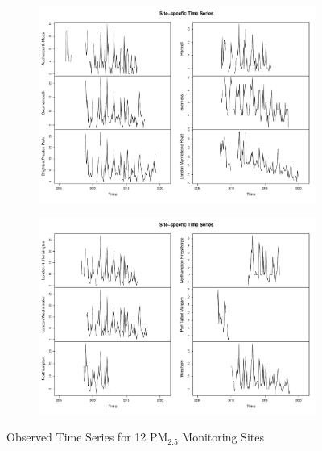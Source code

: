 \begin{figure}
    \begin{subfigure}{.5\textwidth}
        \centering
        \includegraphics[width=\linewidth]{Images/Site ts 1.pdf}
    \end{subfigure}%
    \begin{subfigure}{.5\textwidth}
        \centering
        \includegraphics[width=\linewidth]{Images/Site ts 2.pdf}
    \end{subfigure}
\caption{Observed Time Series for 12 PM$_{2.5}$ Monitoring Sites}
\label{fig:timesites}
\end{figure}

